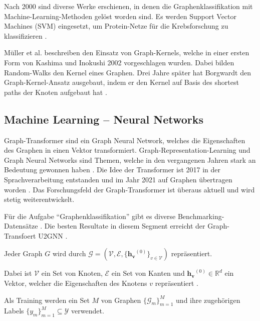 Nach 2000 sind diverse Werke erschienen, in denen die Graphenklassifikation mit Machine-Learning-Methoden gelöst worden sind. Es werden Support Vector Machines (SVM) eingesetzt, um Protein-Netze für die Krebsforschung zu klassifizieren \cite{brown_knowledge-based_2000,guyon_gene_2002}.

Müller et al. beschreiben den Einsatz von Graph-Kernels, welche in einer ersten Form von Kashima und Inokushi \cite{kashima_kernels_2002} 2002 vorgeschlagen wurden. Dabei bilden Random-Walks den Kernel eines Graphen.
Drei Jahre später hat Borgwardt den Graph-Kernel-Ansatz ausgebaut, indem er den Kernel auf Basis des shortest paths der Knoten aufgebaut hat \cite{borgwardt_shortest-path_2005}.

\subsection{Machine Learning – Neural Networks} \label{graph_neural_networks}

Graph-Transformer sind ein Graph Neural Network, welches die Eigenschaften des Graphen in einen Vektor transformiert.
Graph-Representation-Learning und Graph Neural Networks sind Themen, welche in den vergangenen Jahren stark an Bedeutung gewonnen haben \cite{zhang_end--end_2018,velickovic_deep_2018,chen_alchemy_2019,hamilton_graph_2020,ying_transformers_2021}.
Die Idee der Transformer ist 2017 in der Sprachverarbeitung entstanden \cite{vaswani_attention_2017} und im Jahr 2021 auf Graphen übertragen worden \cite{dwivedi_generalization_2021}.
Das Forschungsfeld der Graph-Transformer ist überaus aktuell und wird stetig weiterentwickelt.

Für die Aufgabe \enquote{Graphenklassifikation} gibt es diverse Benchmarking-Datensätze \cite{huggingface_papers_2017,hu_open_2021}.
Die besten Resultate in diesem Segment erreicht der Graph-Transfoert U2GNN \cite{nguyen_universal_2022}.

Jeder Graph $G$ wird durch ${\mathcal{G} = (\mathcal{V}, \mathcal{E}, \{  \mathbf{{h}_{v}}^{(0)} \}_{ {v} \in {\mathcal{V}} } )}$ repräsentiert.

Dabei ist $ \mathcal{V} $ ein Set von Knoten, $ \mathcal{E} $ ein Set von Kanten und $ \mathbf{{h}_{v}}^{(0)} \in \mathbb{R}^d $ ein Vektor, welcher die Eigenschaften des Knotens $v$ repräsentiert \cite{nguyen_universal_2022}.

Als Training werden ein Set $ M $ von Graphen $ \{\mathcal{G}_m \}_{m=1}^M $ und ihre zugehörigen Labels $ \{y_m\}_{m=1}^M \subseteq \mathcal{Y} $ verwendet.

